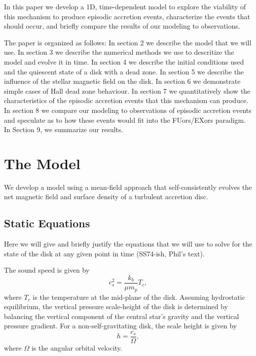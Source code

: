 In this paper we develop a 1D, time-dependent model to explore the viability of this mechanism to produce episodic accretion events, characterize the events that should occur, and briefly compare the results of our modeling to observations.  

The paper is organized as follows: In section 2 we describe the model that we will use.  In section 3 we describe the numerical methods we use to descritize the model and evolve it in time.  In section 4 we describe the initial conditions used and the quiescent state of a disk with a dead zone.  In section 5 we describe the influence of the stellar magnetic field on the disk.  In section 6 we demonstrate simple cases of Hall dead zone behaviour. In section 7 we quantitatively show the characteristics of the episodic accretion events that this mechanism can produce.  In section 8 we compare our modeling to observations of episodic accretion events and speculate as to how these events would fit into the FUors/EXors paradigm.  In Section 9, we summarize our results.  




\newpage
\section{The Model}
\label{1dmodel}
We develop a model using a mean-field approach that self-consistently evolves the net magnetic field and surface density of a turbulent accretion disc.     


\subsection{Static Equations} 
Here we will give and briefly justify the equations that we will use to solve for the state of the disk at any given point in time (SS74-ish, Phil's text).

The sound speed is given by
\begin{equation} 
c_s^2        = \frac{k_b}{\mu m_p}T_c ,              
\end{equation}
where $T_c$ is the temperature at the mid-plane of the disk.  Assuming hydrostatic equilibrium, the vertical pressure scale-height of the disk is determined by balancing the vertical component of the central star's gravity and the vertical pressure gradient.  For a non-self-gravitating disk, the scale height is given by     
\begin{equation} 
h            = \frac{c_s}{\Omega},  
\end{equation}
where $\Omega$ is the angular orbital velocity.

